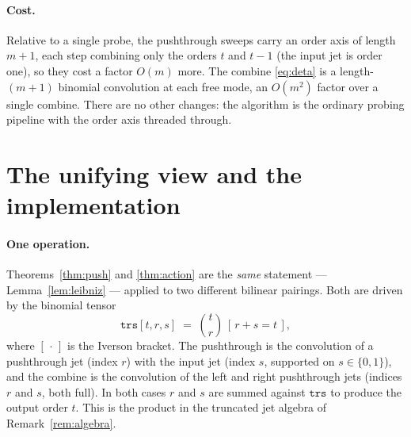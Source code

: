 \documentclass[11pt]{article}
\theoremstyle{definition}
\theoremstyle{plain}
\begin{document}
\paragraph{Cost.}
Relative to a single probe, the pushthrough sweeps carry an order axis of length $m+1$, each step
combining only the orders $t$ and $t-1$ (the input jet is order one), so they cost a factor $O(m)$
more. The combine \eqref{eq:deta} is a length-$(m{+}1)$ binomial convolution at each free mode, an
$O(m^2)$ factor over a single combine. There are no other changes: the algorithm is the ordinary
probing pipeline with the order axis threaded through.

\section{The unifying view and the implementation}
\label{sec:impl}

\paragraph{One operation.}
Theorems~\ref{thm:push} and \ref{thm:action} are the \emph{same} statement --- Lemma~\ref{lem:leibniz}
--- applied to two different bilinear pairings. Both are driven by the binomial tensor
\begin{equation}
  \label{eq:trs}
  \texttt{trs}[t,r,s] \;=\; \binom{t}{r}\,[\,r + s = t\,],
\end{equation}
where $[\,\cdot\,]$ is the Iverson bracket. The pushthrough is the convolution of a pushthrough jet
(index $r$) with the input jet (index $s$, supported on $s \in \{0,1\}$), and the combine is the
convolution of the left and right pushthrough jets (indices $r$ and $s$, both full). In both cases
$r$ and $s$ are summed against $\texttt{trs}$ to produce the output order $t$. This is the product in
the truncated jet algebra of Remark~\ref{rem:algebra}.
\end{document}
